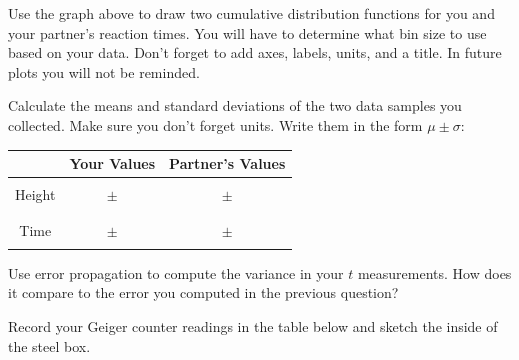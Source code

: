 \documentclass[addpoints]{physlabs}  %
\begin{document}
\begin{postlab}
\question[3] Use the graph above to draw two cumulative distribution functions for you and your partner's reaction times. You will have to determine what bin size to use based on your data.
Don't forget to add axes, labels, units, and a title.
In future plots you will not be reminded.

\question[3] Calculate the means and standard deviations of the two data samples you collected.
Make sure you don't forget units.
Write them in the form $\mu\pm\sigma$:
\begin{table}[h]
    \centering
    \begin{tabular}{c|c|c}
         & Your Values & Partner's Values\\
         \hline & & \\
         Height &  $\pm$ &  $\pm$\\ & & \\
         \hline & & \\
         Time &  $\pm$ &  $\pm$\\ & & \\
    \end{tabular}
    \label{tab:placeholder}
\end{table}

\question[3] Use error propagation to compute the variance in your $t$ measurements. How does it compare to the error you computed in the previous question?


\question[2] Record your Geiger counter readings in the table below and sketch the inside of the steel box.

\begin{center}
\end{center}


\end{postlab}
\end{document}
